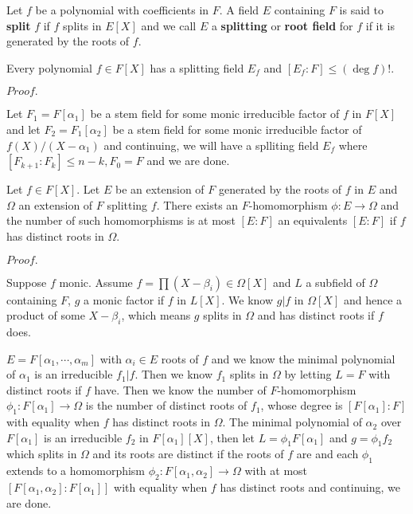 \documentclass{article}
\newcommand{\Pf}[1]{$Proof.$\par}
\begin{document}
\begin{definition}
    Let $f$ be a polynomial with coefficients in $F$. A field $E$ containing $F$ is said to \textbf{split} $f$ if $f$ splits in $E[X]$ and we call $E$ a \textbf{splitting} or \textbf{root field} for $f$ if it is generated by the roots of $f$.
\end{definition}

\begin{proposition}
    Every polynomial $f\in F[X]$ has a splitting field $E_f$ and $[E_f:F] \leq (\deg f)!$.
\end{proposition}
\Pf\par
    Let $F_1 = F[\alpha_1]$ be a stem field for some monic irreducible factor of $f$ in $F[X]$ and let $F_2 = F_1[\alpha_2]$ be a stem field for some monic irreducible factor of $f(X)/(X-\alpha_1)$ and continuing, we will have a splliting field $E_f$ where $[F_{k+1}:F_k] \leq n-k, F_0 = F$ and we are done.

\begin{proposition}
    Let $f\in F[X]$. Let $E$ be an extension of $F$ generated by the roots of $f$ in $E$ and $\Omega$ an extension of $F$ splitting $f$. There exists an $F$-homomorphism $\phi:E\to \Omega$ and the number of such homomorphisms is at most $[E:F]$ an equivalents $[E:F]$ if $f$ has distinct roots in $\Omega$.
\end{proposition}
\Pf\par
    Suppose $f$ monic. Assume $f = \prod (X-\beta_i) \in \Omega[X]$ and $L$ a subfield of $\Omega$ containing $F$, $g$ a monic factor if $f$ in $L[X]$. We know $g|f$ in $\Omega[X]$ and hence a product of some $X-\beta_i$, which means $g$ splits in $\Omega$ and has distinct roots if $f$ does.\par
    $E = F[\alpha_1,\cdots,\alpha_m]$ with $\alpha_i \in E$ roots of $f$ and we know the minimal polynomial of $\alpha_1$ is an irreducible $f_1|f$. Then we know $f_1$ splits in $\Omega$ by letting  $L=F$ with distinct roots if $f$ have. Then we know the number of $F$-homomorphism $\phi_1:F[\alpha_1] \to \Omega$ is the number of distinct roots of $f_1$, whose degree is $[F[\alpha_1]:F]$ with equality when $f$ has distinct roots in $\Omega$. The minimal polynomial of $\alpha_2$ over $F[\alpha_1]$ is an irreducible $f_2$ in $F[\alpha_1][X]$, then let $L = \phi_1F[\alpha_1]$ and $g = \phi_1f_2$ which splits in $\Omega$ and its roots are distinct if the roots of $f$ are and each $\phi_1$ extends to a homomorphism $\phi_2:F[\alpha_1,\alpha_2] \to \Omega$ with at most $[F[\alpha_1,\alpha_2]:F[\alpha_1]]$ with equality when $f$ has distinct roots and continuing, we are done.
\end{document}
